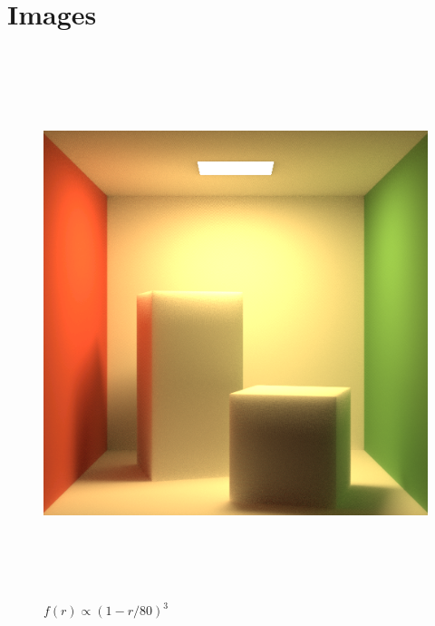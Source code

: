 \documentclass[10pt]{article}
\begin{document}
\section{Images}
\begin{figure}[h]
	\centering
	\includegraphics[height=160mm]{cubic.png}
	\caption{$f(r) \propto (1-r/80)^3$}
\end{figure}
\end{document}
